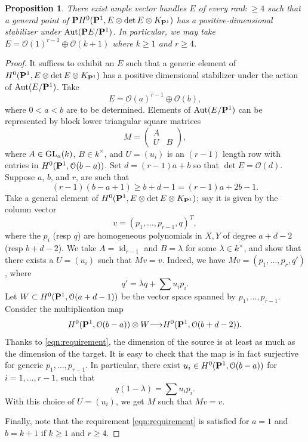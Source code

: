 \documentclass[11pt,reqno]{amsart}
\theoremstyle{plain}
\newtheorem{proposition}[theorem]{Proposition}
\theoremstyle{definition}
\theoremstyle{remark}
\numberwithin{equation}{section}
\renewcommand{\k}{k}
\DeclareMathOperator{\id}{id}
\renewcommand{\to}{{\longrightarrow}}
\numberwithin{equation}{section}
\renewcommand{\O}{\mathcal O}
\begin{document}
\begin{proposition}\label{prop:specialE}
  There exist ample vector bundles $E$ of every rank $\geq 4$ such that a general point of $\P H^0(\P^1, E \otimes \det E \otimes K_{\P^1})$ has a positive-dimensional stabilizer under $\Aut(\P E/\P^1)$.
  In particular, we may take $E = \O(1)^{r-1} \oplus \O(k+1)$ where $k \geq 1$ and $r \geq 4$.
\end{proposition}
\begin{proof}
  It suffices to exhibit an $E$ such that a generic element of $H^0(\P^1, E \otimes \det E \otimes K_{\P^1})$ has a positive dimensional stabilizer under the action of $\Aut(E/\P^1)$.
  Take
  \[ E = \O(a)^{r-1} \oplus \O(b),\]
  where $0 < a < b$ are to be determined.
  Elements of $\Aut (E/\P^1)$ can be represented by block lower triangular square matrices
  \[M = 
    \begin{pmatrix}
      A &  \\
      U & B
    \end{pmatrix},
  \]
  where $A \in \GL_a(\k)$, $B \in \k^\times$, and $U = (u_i)$ is an $(r-1)$ length row with entries in $H^0(\P^1, \O(b-a))$.
  Set $d = (r-1)a + b$ so that $\det E = \O(d)$.
  Suppose $a$, $b$, and $r$, are such that
  \begin{equation}\label{eqn:requirement}
    (r-1) (b-a+1) \geq b+d-1 = (r-1)a+2b-1.
  \end{equation}
  Take a general element of $H^0(\P^1, E \otimes \det E \otimes K_{\P^1})$; say it is given by the column vector
  \[ v = (p_1, \dots, p_{r-1}, q)^T,\]
  where the $p_i$ (resp $q$) are homogeneous polynomials in $X, Y$ of degree $a+d-2$ (resp $b+d-2$).
  We take $A = \id_{r-1}$ and $B = \lambda$ for some $\lambda \in \k^\times$, and show that there exists a $U = (u_{i})$ such that $Mv = v$.
  Indeed, we have $Mv = (p_1, \dots, p_r, q')$, where
  \[ q' = \lambda q + \sum u_{i}p_i. \]
  Let $W \subset H^0(\P^1, \O(a+d-1))$ be the vector space spanned by $p_1, \dots, p_{r-1}$.
  Consider the multiplication map
  \[ H^0(\P^1, \O(b-a)) \otimes W \to H^0(\P^1, \O(b+d-2)).\]
  Thanks to \eqref{eqn:requirement}, the dimension of the source is at least as much as the dimension of the target.
  It is easy to check that the map is in fact surjective for generic $p_1, \dots, p_{r-1}$.
  In particular, there exist $u_i \in H^0(\P^1, \O(b-a))$ for $i = 1, \dots, r-1$, such that
  \[ q(1-\lambda) = \sum u_i p_i.\]
  With this choice of $U = (u_i)$, we get $M$ such that $Mv = v$.

  Finally, note that the requirement \eqref{eqn:requirement} is satisfied for $a = 1$ and $b = k+1$ if $k \geq 1$ and $r \geq 4$.
\end{proof}
\end{document}
